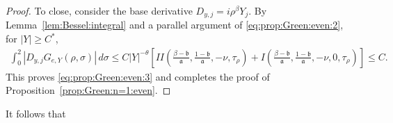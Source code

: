 \documentclass[12pt]{amsart}
\begin{document}
\begin{proof}


To close, consider the base derivative $D_{y,j}=i\rho^{\beta}Y_j$. By Lemma~\ref{lem:Bessel:integral} and a parallel argument of \eqref{eq:prop:Green:even:2}, for $|Y|\ge C^*$,
\begin{align*}
    \int_0^2 |D_{y,j}G_{e,Y}(\rho,\sigma)| \, d\sigma \le C|Y|^{-\theta} \left[II\left(\frac{\beta-\mathfrak b}{\mathfrak a}, \frac{1-\mathfrak b}{\mathfrak a}, -\nu, \tau_\rho \right) + I\left(\frac{\beta-\mathfrak b}{\mathfrak a}, \frac{1-\mathfrak b}{\mathfrak a}, -\nu, 0, \tau_\rho \right) \right]\le C.
\end{align*}
This proves \eqref{eq:prop:Green:even:3} and completes the proof of Proposition~\ref{prop:Green:n=1:even}.
\end{proof}








It follows that
\end{document}
